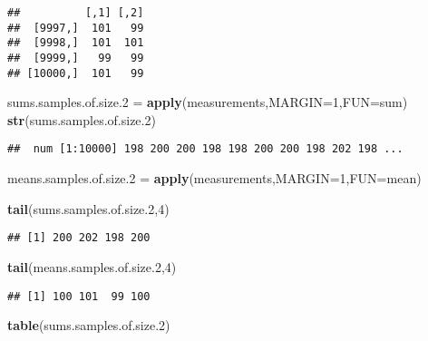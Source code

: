 \documentclass[]{book}
\newenvironment{Shaded}{\begin{snugshade}}{\end{snugshade}}
\newcommand{\DataTypeTok}[1]{\textcolor[rgb]{0.13,0.29,0.53}{#1}}
\newcommand{\DecValTok}[1]{\textcolor[rgb]{0.00,0.00,0.81}{#1}}
\newcommand{\FloatTok}[1]{\textcolor[rgb]{0.00,0.00,0.81}{#1}}
\newcommand{\KeywordTok}[1]{\textcolor[rgb]{0.13,0.29,0.53}{\textbf{#1}}}
\newcommand{\NormalTok}[1]{#1}
\newcommand{\StringTok}[1]{\textcolor[rgb]{0.31,0.60,0.02}{#1}}
\begin{document}
\begin{verbatim}
##          [,1] [,2]
##  [9997,]  101   99
##  [9998,]  101  101
##  [9999,]   99   99
## [10000,]  101   99
\end{verbatim}

\begin{Shaded}
\begin{Highlighting}[]
\NormalTok{sums.samples.of.size}\FloatTok{.2}\NormalTok{ =}\StringTok{ }\KeywordTok{apply}\NormalTok{(measurements,}\DataTypeTok{MARGIN=}\DecValTok{1}\NormalTok{,}\DataTypeTok{FUN=}\NormalTok{sum)}
\KeywordTok{str}\NormalTok{(sums.samples.of.size}\FloatTok{.2}\NormalTok{)}
\end{Highlighting}
\end{Shaded}

\begin{verbatim}
##  num [1:10000] 198 200 200 198 198 200 200 198 202 198 ...
\end{verbatim}

\begin{Shaded}
\begin{Highlighting}[]
\NormalTok{means.samples.of.size}\FloatTok{.2}\NormalTok{ =}\StringTok{ }\KeywordTok{apply}\NormalTok{(measurements,}\DataTypeTok{MARGIN=}\DecValTok{1}\NormalTok{,}\DataTypeTok{FUN=}\NormalTok{mean)}

\KeywordTok{tail}\NormalTok{(sums.samples.of.size}\FloatTok{.2}\NormalTok{,}\DecValTok{4}\NormalTok{)}
\end{Highlighting}
\end{Shaded}

\begin{verbatim}
## [1] 200 202 198 200
\end{verbatim}

\begin{Shaded}
\begin{Highlighting}[]
\KeywordTok{tail}\NormalTok{(means.samples.of.size}\FloatTok{.2}\NormalTok{,}\DecValTok{4}\NormalTok{)}
\end{Highlighting}
\end{Shaded}

\begin{verbatim}
## [1] 100 101  99 100
\end{verbatim}

\begin{Shaded}
\begin{Highlighting}[]
\KeywordTok{table}\NormalTok{(sums.samples.of.size}\FloatTok{.2}\NormalTok{)}
\end{Highlighting}
\end{Shaded}
\end{document}
